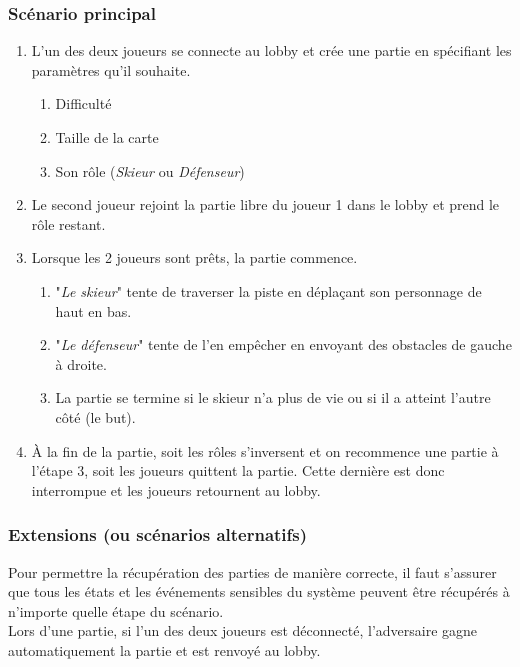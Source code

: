 \documentclass[a4paper,12pt]{article}
\begin{document}
	\subsubsection{Scénario principal}
	\begin{enumerate}
		\item L'un des deux joueurs se connecte au lobby et crée une partie en spécifiant les paramètres qu'il souhaite.
		\begin{enumerate}
			\item Difficulté
			\item Taille de la carte
			\item Son rôle (\textit{Skieur} ou \textit{Défenseur})
		\end{enumerate}
		\item Le second joueur rejoint la partie libre du joueur 1 dans le lobby et prend le rôle restant.
		\item Lorsque les 2 joueurs sont prêts, la partie commence.
		\begin{enumerate}
			\item "\textit{Le skieur}" tente de traverser la piste en déplaçant son personnage de haut en bas.
			\item "\textit{Le défenseur}" tente de l'en empêcher en envoyant des obstacles de gauche à droite.
			\item La partie se termine si le skieur n'a plus de vie ou si il a atteint l'autre côté (le but).
		\end{enumerate}
		\item À la fin de la partie, soit les rôles s'inversent et on recommence une partie à l'étape 3, soit les joueurs quittent la partie. Cette dernière est donc interrompue et les joueurs retournent au lobby.
	\end{enumerate}
	
	\subsubsection{Extensions (ou scénarios alternatifs)}
	Pour permettre la récupération des parties de manière correcte, il faut s'assurer que tous les états et les événements sensibles du système peuvent être récupérés à n'importe quelle étape du scénario. \\
	
	Lors d'une partie, si l'un des deux joueurs est déconnecté, l'adversaire gagne automatiquement la partie et est renvoyé au lobby.
	
\end{document}
